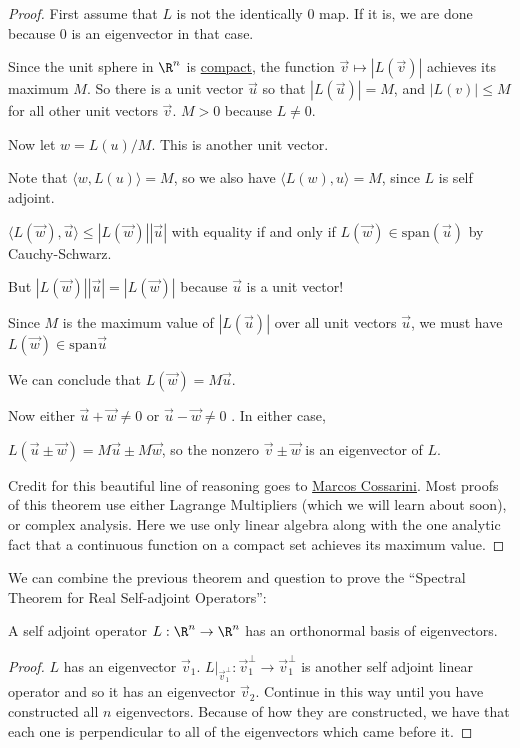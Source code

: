 \documentclass{ximera}
\begin{document}
\begin{proof}
	First assume that $L$ is not the identically $0$ map.  If it is, we are done because $0$ is an eigenvector in that case.
	
	Since the unit sphere in $\R^n$ is \href{http://en.wikipedia.org/wiki/Compact_space}{compact},
	 the function $\vec{v} \mapsto |L(\vec{v})|$ achieves its maximum $M$.  So there is a unit vector 
	$\vec{u}$ so that $|L(\vec{u})| = M$, and $|L(v)| \leq M$ for all other unit vectors $\vec{v}$.  $M > 0$ because $L \neq 0$.
	
	Now let $w = L(u)/M$.  This is another unit vector.
	
	Note that $\langle w, L(u)\rangle = M$, so we also have $\langle L(w), u \rangle = M$, since $L$ is self adjoint.
	
	$\langle L(\vec{w}),\vec{u}\rangle \leq |L(\vec{w})||\vec{u}|$ with equality if and only if $L(\vec{w}) \in \mathrm{span}(\vec{u})$ by Cauchy-Schwarz.
	
	But $|L(\vec{w})||\vec{u}| = |L(\vec{w})|$ because $\vec{u}$ is a unit vector!
		
	Since $M$ is the maximum value of $|L(\vec{u})|$ over all unit vectors $\vec{u}$, we must have  $L(\vec{w}) \in \mathrm{span}{\vec{u}}$
	
	We can conclude that $L(\vec{w}) = M\vec{u}$.
	
	Now either $\vec{u}+\vec{w} \neq 0$ or $\vec{u}-\vec{w} \neq 0$ .  In either case,
	
	$L(\vec{u} \pm \vec{w}) = M\vec{u} \pm M\vec{w}$, so the nonzero $\vec{v} \pm \vec{w}$ is an eigenvector of $L$.
	
	Credit for this beautiful line of reasoning goes to \href{http://mathoverflow.net/a/118759/1106}{Marcos Cossarini}.  Most proofs of this theorem use either 
	Lagrange Multipliers (which we will learn about soon), or complex analysis.  Here we use only linear algebra along with the one analytic fact that a continuous 
	function on a compact set achieves its maximum value.
\end{proof}

	We can combine the previous theorem and question to prove the ``Spectral Theorem for Real Self-adjoint Operators'':  
	
	\begin{theorem}
		A self adjoint operator $L : \R^n \to \R^n$ has an orthonormal basis of eigenvectors.
	\end{theorem}
	
\begin{proof}
	$L$ has an eigenvector $\vec{v}_1$.  $L\big|_{\vec{v}_1^\perp} : \vec{v}_1^\perp \to \vec{v}_1^\perp$  is another self adjoint linear operator and so it has an eigenvector $\vec{v}_2$.  
	Continue in this way until you have constructed all $n$ eigenvectors.  Because of how they are constructed, we have that each one is perpendicular to all of the 
	eigenvectors which came before it. 
\end{proof}
\end{document}
